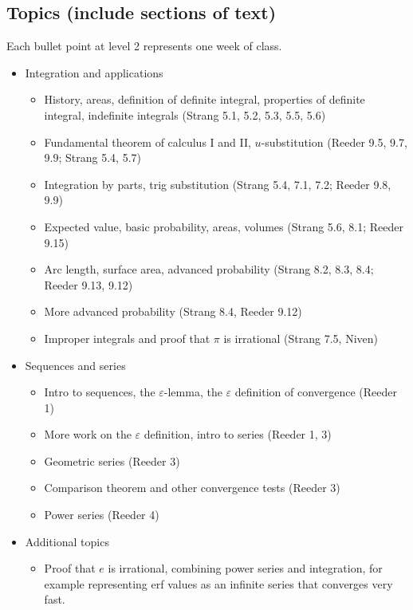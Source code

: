 \documentclass[11pt,oneside]{amsart}
\newcommand{\eps}{\varepsilon}
\begin{document}
\subsection{Topics (include sections of text)}
Each bullet point at level 2 represents one week of class.
\begin{itemize}
  \item Integration and applications
        \begin{itemize}
          \item History, areas, definition of definite integral, properties of definite integral, indefinite integrals (Strang 5.1, 5.2, 5.3, 5.5, 5.6)
          \item Fundamental theorem of calculus I and II, $u$-substitution (Reeder 9.5, 9.7, 9.9; Strang 5.4, 5.7)
          \item Integration by parts, trig substitution (Strang 5.4, 7.1, 7.2; Reeder 9.8, 9.9)
          \item Expected value, basic probability, areas, volumes (Strang 5.6, 8.1; Reeder 9.15)
          \item Arc length, surface area, advanced probability (Strang 8.2, 8.3, 8.4; Reeder 9.13, 9.12)
          \item More advanced probability (Strang 8.4, Reeder 9.12)
          \item Improper integrals and proof that $\pi$ is irrational (Strang 7.5, Niven)
        \end{itemize}
  \item Sequences and series
        \begin{itemize}
          \item Intro to sequences, the $\eps$-lemma, the $\eps$ definition of convergence (Reeder 1)
          \item More work on the $\eps$ definition, intro to series (Reeder 1, 3)
          \item Geometric series (Reeder 3)
          \item Comparison theorem and other convergence tests (Reeder 3)
          \item Power series (Reeder 4)
        \end{itemize}
  \item Additional topics
        \begin{itemize}
          \item Proof that $e$ is irrational, combining power series and integration, for example representing erf values as an infinite series that converges very fast.
        \end{itemize}
\end{itemize}
\end{document}

